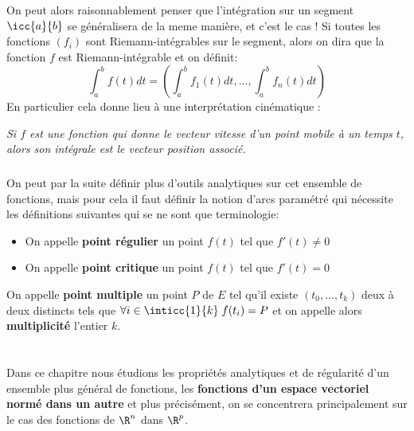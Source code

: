 \subsection*{}
On peut alors raisonnablement penser que l'intégration sur un segment \(\icc{a}{b}\) se généralisera de la meme manière, et c'est le cas ! Si toutes les fonctions \((f_i)\) sont Riemann-intégrables sur le segment, alors on dira que la fonction \(f\) est Riemann-intégrable et on définit:
\[
   \int_{a}^{b} f(t) d t = \left(\int_{a}^{b} f_1(t) d t, \ldots, \int_{a}^{b} f_n(t) d t\right)   
\]
En particulier cela donne lieu à une interprétation cinématique :
\begin{center}
   \textit{Si \(f\) est une fonction qui donne le vecteur vitesse d'un point mobile à un temps \(t\), alors son intégrale est le vecteur position associé.}
\end{center}
\subsection*{}
On peut par la suite définir plus d'outils analytiques sur cet ensemble de fonctions, mais pour cela il faut définir la notion d'arcs paramétré qui nécessite les définitions suivantes qui se ne sont que terminologie:
\begin{itemize}
   \item On appelle \textbf{point régulier} un point \(f(t)\) tel que \(f'(t) \neq 0\)
   \item On appelle \textbf{point critique} un point \(f(t)\) tel que \(f'(t) = 0\)
\end{itemize}
On appelle \textbf{point multiple} un point \(P\) de \(E\) tel qu'il existe \((t_0, \ldots, t_k)\) deux à deux distincts tels que \(\forall i \in \inticc{1}{k} \; f(t_i) = P\) et on appelle alors \textbf{multiplicité} l'entier \(k\).

\chapter*{}

Dans ce chapitre nous étudions les propriétés analytiques et de régularité d'un ensemble plus général de fonctions, les \textbf{fonctions d'un espace vectoriel normé dans un autre} et plus précisément, on se concentrera principalement sur le cas des fonctions de \(\R^n\) dans \(\R^p\).\<

